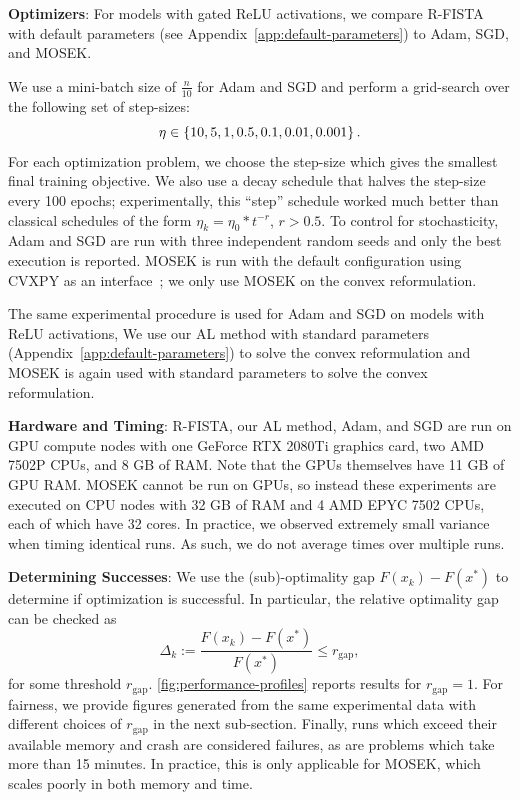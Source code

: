 \textbf{Optimizers}: For models with gated ReLU activations, we compare R-FISTA with default parameters (see Appendix~\ref{app:default-parameters}) to Adam, SGD, and MOSEK.\@

We use a mini-batch size of \( \frac{n}{10} \) for Adam and SGD and perform a grid-search over the following set of step-sizes:
\[
	\eta \in \left\{10, 5, 1, 0.5, 0.1, 0.01, 0.001\right\}.
\]
For each optimization problem, we choose the step-size which gives the smallest final training objective.
We also use a decay schedule that halves the step-size every 100 epochs; experimentally, this ``step'' schedule worked much better than classical schedules of the form \( \eta_k = \eta_0 * t^{-r} \), \( r > 0.5 \).
To control for stochasticity, Adam and SGD are run with three independent random seeds and only the best execution is reported.
MOSEK is run with the default configuration using CVXPY as an interface~\citep{diamond2016cvxpy, agrawal2018rewriting};
we only use MOSEK on the convex reformulation.

The same experimental procedure is used for Adam and SGD on models with ReLU activations,
We use our AL method with standard parameters (Appendix~\ref{app:default-parameters}) to solve the convex reformulation and MOSEK is again used with standard parameters to solve the convex reformulation.

\textbf{Hardware and Timing}:
R-FISTA, our AL method, Adam, and SGD are run on GPU compute nodes with one GeForce RTX 2080Ti graphics card, two AMD 7502P CPUs, and 8 GB of RAM.
Note that the GPUs themselves have 11 GB of GPU RAM.\@
MOSEK cannot be run on GPUs, so instead these experiments are executed on CPU nodes with 32 GB of RAM and 4 AMD EPYC 7502 CPUs, each of which have 32 cores.
In practice, we observed extremely small variance when timing identical runs.
As such, we do not average times over multiple runs.

\textbf{Determining Successes}:
We use the (sub)-optimality gap \( F(x_k) - F(x^*) \) to determine if optimization is successful.
In particular, the relative optimality gap can be checked as
\[
	\Delta_k := \frac{F(x_k) - F(x^*)}{F(x^*)} \leq r_{\text{gap}},
\]
for some threshold \( r_{\text{gap}} \).
\cref{fig:performance-profiles} reports results for \( r_{\text{gap}} = 1 \).
For fairness, we provide figures generated from the same experimental data with different choices of \( r_{\text{gap}}\) in the next sub-section.
Finally, runs which exceed their available memory and crash are considered failures, as are problems which take more than 15 minutes.
In practice, this is only applicable for MOSEK, which scales poorly in both memory and time.

